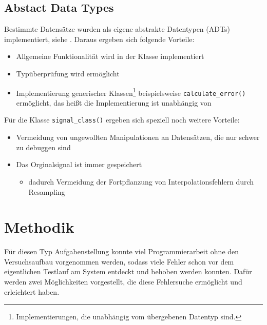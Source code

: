 \documentclass[../Report.tex]{subfiles}
\begin{document}
\subsection{Abstact Data Types}
\label{subsec:code.adt}
Bestimmte Datensätze wurden als eigene abstrakte Datentypen (ADTs) implementiert, siehe \cite[Kap. 6.1]{mcConnell}. Daraus ergeben sich folgende Vorteile:
\begin{itemize}
	\item Allgemeine Funktionalität wird in der Klasse implementiert
	\item Typüberprüfung wird ermöglicht
	\item Implementierung generischer Klassen\footnote{Implementierungen, die unabhängig vom übergebenen Datentyp sind.} beispielsweise \lstinline{calculate_error()} ermöglicht, das heißt die Implementierung ist unabhängig von
\end{itemize}
Für die Klasse \lstinline{signal_class()} ergeben sich speziell noch weitere Vorteile:
\begin{itemize}
\item Vermeidung von ungewollten Manipulationen an Datensätzen, die nur schwer zu debuggen sind
	\item Das Orginalsignal ist immer gespeichert 
	\begin{itemize}
		\item dadurch Vermeidung der Fortpflanzung von Interpolationsfehlern durch Resampling
	\end{itemize}
\end{itemize}

\section{Methodik}
\label{subsec:code.methodik}
Für diesen Typ Aufgabenstellung konnte viel Programmierarbeit ohne den Versuchsaufbau vorgenommen werden, sodass viele Fehler schon vor dem eigentlichen Testlauf am System entdeckt und behoben werden konnten. Dafür werden zwei Möglichkeiten vorgestellt, die diese Fehlersuche ermöglicht und erleichtert haben.
\end{document}

